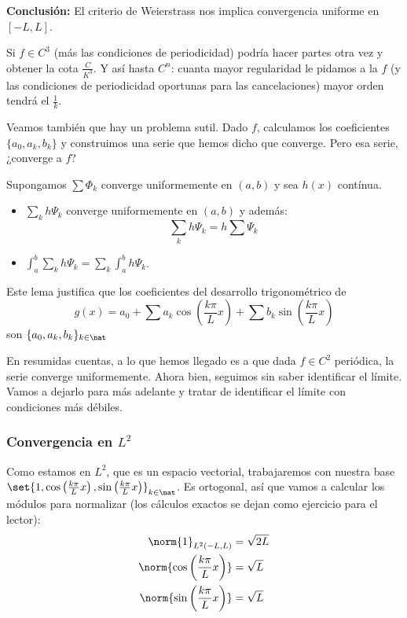 		\textbf{Conclusión:} El criterio de Weierstrass nos implica convergencia uniforme en $[-L,L]$.

		\obs Si $f \in C^3$ (más las condiciones de periodicidad) podría hacer partes otra vez y obtener la cota $\frac{C}{K^3}$. Y así hasta $C^n$: cuanta mayor regularidad le pidamos a la $f$ (y las condiciones de periodicidad oportunas para las cancelaciones) mayor orden tendrá el $\frac{1}{k}$.

		Veamos también que hay un problema sutil. Dado $f$, calculamos los coeficientes $\{a_0,a_k,b_k\}$ y construimos una serie que hemos dicho que converge. Pero esa serie, ¿converge a $f$?

		\begin{lemma}
			Supongamos $\sum \Phi_k$ converge uniformemente en $(a,b)$ y sea $h(x)$ contínua.

			\begin{itemize}
				\item $\sum_k h \Psi_k$ converge uniformemente en $(a,b)$ y además:
				\[ \sum_k h \Psi_k = h \sum \Psi_k\]

				\item $\displaystyle \int_a^b \sum_k h \Psi_k = \sum_k \int_a^b h \Psi_k$.
			\end{itemize}

		\end{lemma}

		Este lema justifica que los coeficientes del desarrollo trigonométrico de$$g(x) = a_0 + \sum a_k \cos \left( \frac{k \pi}{L} x \right) + \sum b_k \sin \left( \frac{k \pi}{L} x \right) $$ son $\{a_0,a_k,b_k\}_{k \in \nat}$

		En resumidas cuentas, a lo que hemos llegado es a que dada $f \in C^2$ periódica, la serie converge uniformemente. Ahora bien, seguimos sin saber identificar el límite. Vamos a dejarlo para más adelante y tratar de identificar el límite con condiciones más débiles.

		\subsubsection{Convergencia en $L^2$}

		Como estamos en $L^2$, que es un espacio vectorial, trabajaremos con nuestra base $\set{1, \cos \left( \frac{k \pi}{L} x \right), \sin \left( \frac{k \pi}{L} x \right)}_{k \in \nat}$. Es ortogonal, así que vamos a calcular los módulos para normalizar (los cálculos exactos se dejan como ejercicio para el lector):
		\begin{align*}
		\norm{1}_{L^2(-L,L)} &= \sqrt{2L}\\
		\norm{\cos \left( \frac{k \pi}{L} x \right)} &= \sqrt{L} \\
		\norm{\sin \left( \frac{k \pi}{L} x \right)} &= \sqrt{L}
		\end{align*}

